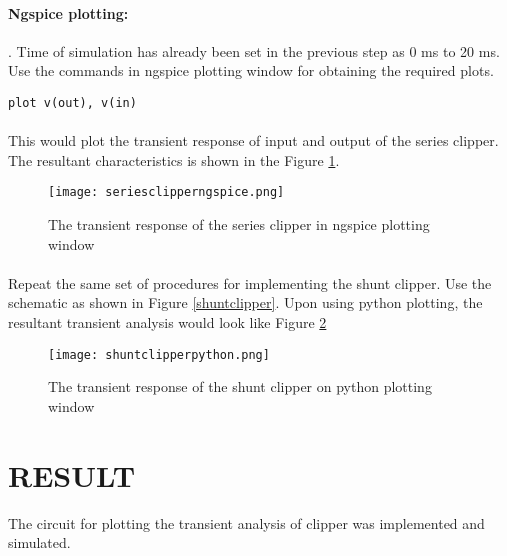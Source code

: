 \paragraph{Ngspice plotting:}. Time of simulation has already been set in the previous step as 0 ms to 20 ms. Use the commands in ngspice plotting window for obtaining the required plots.

\texttt{plot v(out), v(in) }

\paragraph{}

This would plot the transient response of input and output of the series clipper. The resultant characteristics is shown in the Figure \ref{seriesclipperngspice}. 

\begin{figure}[h]
\centering
\texttt{[image: seriesclipperngspice.png]}
\caption{The transient response of the series clipper in ngspice plotting window}
\label{seriesclipperngspice}
\end{figure}

\paragraph{}Repeat the same set of procedures for implementing the shunt clipper. Use the schematic as shown in Figure \ref{shuntclipper}. Upon using python plotting, the resultant transient analysis would look like Figure \ref{shuntclipperpython}


\begin{figure}[h]
\centering
\texttt{[image: shuntclipperpython.png]}
\caption{The transient response of the shunt clipper on python plotting window}
\label{shuntclipperpython}
\end{figure}

\section*{RESULT}
The circuit for plotting the transient analysis of clipper was implemented and simulated.



